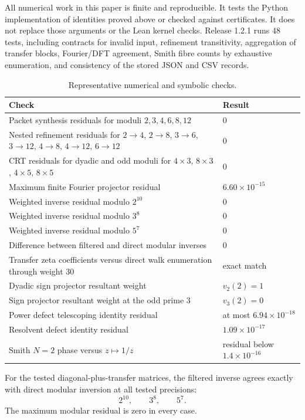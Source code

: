 All numerical work in this paper is finite and reproducible. It tests the
Python implementation of identities proved above or checked against
certificates. It does not replace those arguments or the Lean kernel checks.
Release 1.2.1 runs 48 tests, including contracts for invalid input, refinement
transitivity, aggregation of transfer blocks, Fourier/DFT agreement, Smith
fibre counts by exhaustive enumeration, and consistency of the stored JSON
and CSV records.

\begin{table}[htbp]
\centering
\caption{Representative numerical and symbolic checks.}
\begin{tabularx}{\textwidth}{L{0.54\textwidth}Y}
\toprule
Check & Result \\
\midrule
Packet synthesis residuals for moduli $2,3,4,6,8,12$ & $0$ \\
Nested refinement residuals for $2\to4$, $2\to8$, $3\to6$, $3\to12$, $4\to8$, $4\to12$, $6\to12$ & $0$ \\
CRT residuals for dyadic and odd moduli for $4\times3$, $8\times3$, $4\times5$, $8\times5$ & $0$ \\
Maximum finite Fourier projector residual & $6.60\times10^{-15}$ \\
Weighted inverse residual modulo $2^{10}$ & $0$ \\
Weighted inverse residual modulo $3^8$ & $0$ \\
Weighted inverse residual modulo $5^7$ & $0$ \\
Difference between filtered and direct modular inverses & $0$ \\
Transfer zeta coefficients versus direct walk enumeration through weight $30$ & exact match \\
Dyadic sign projector resultant weight & $v_2(2)=1$ \\
Sign projector resultant weight at the odd prime $3$ & $v_3(2)=0$ \\
Power defect telescoping identity residual & at most $6.94\times10^{-18}$ \\
Resolvent defect identity residual & $1.09\times10^{-17}$ \\
Smith $N=2$ phase versus $z\mapsto1/z$ & residual below $1.4\times10^{-16}$ \\
\bottomrule
\end{tabularx}
\end{table}

\begin{certificate}
For the tested diagonal-plus-transfer matrices, the filtered inverse agrees exactly with direct modular inversion at all tested precisions:
\[
2^{10},\qquad3^8,\qquad5^7.
\]
The maximum modular residual is zero in every case.
\end{certificate}


